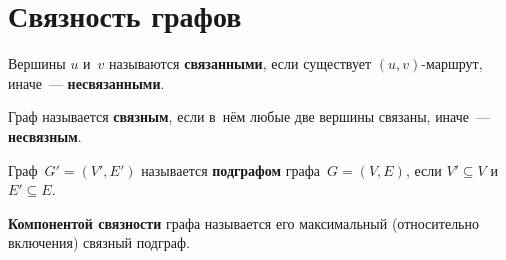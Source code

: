 \section{Связность графов}

Вершины $u$ и~$v$ называются \textbf{связанными}, если существует $(u, v)$-маршрут, иначе~---
\textbf{несвязанными}.

Граф называется \textbf{связным}, если в~нём любые две вершины связаны, иначе~--- \textbf{несвязным}.

Граф~$G' = (V', E')$ называется \textbf{подграфом} графа~$G = (V, E)$, если $V' \subseteq V$ и
~$E' \subseteq E$.

\textbf{Компонентой связности} графа называется его максимальный (относительно включения)
связный подграф.

 


